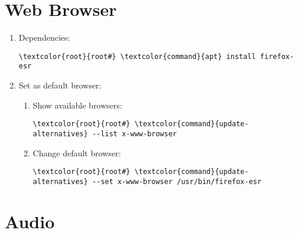 \documentclass[10pt, a4paper, onecolumn, openany]{book} %
\begin{document}
\chapter{Web Browser}
\begin{enumerate}
    \item Dependencies:
\begin{Verbatim}[commandchars=\\\{\}]
\textcolor{root}{root#} \textcolor{command}{apt} install firefox-esr
\end{Verbatim}
    \item Set as default browser:
    \begin{enumerate}
        \item Show available browsers:
        \begin{Verbatim}[commandchars=\\\{\}]
\textcolor{root}{root#} \textcolor{command}{update-alternatives} --list x-www-browser
\end{Verbatim}
        \item Change default browser:
\begin{Verbatim}[commandchars=\\\{\}]
\textcolor{root}{root#} \textcolor{command}{update-alternatives} --set x-www-browser /usr/bin/firefox-esr
\end{Verbatim}
    \end{enumerate}
\end{enumerate}
\chapter{Audio}
\end{document}
